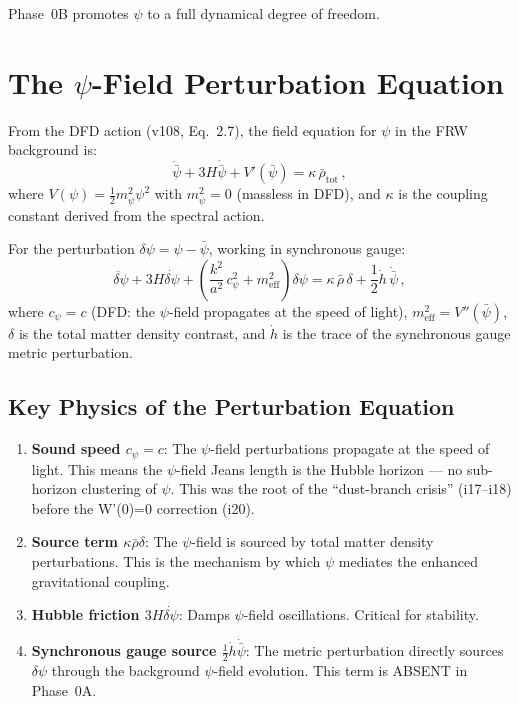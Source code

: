 \documentclass[11pt,a4paper]{article}
\begin{document}
Phase~0B promotes $\psi$ to a full dynamical degree of freedom.

\section{The $\psi$-Field Perturbation Equation}

From the DFD action (v108, Eq.~2.7), the field equation for $\psi$ in the FRW background is:
\begin{equation}
\ddot{\bar{\psi}} + 3H\dot{\bar{\psi}} + V'(\bar{\psi}) = \kappa\,\bar{\rho}_{\mathrm{tot}}\,,
\end{equation}
where $V(\psi) = \frac{1}{2}m_\psi^2\psi^2$ with $m_\psi^2 = 0$ (massless in DFD), and $\kappa$ is the coupling constant derived from the spectral action.

For the perturbation $\delta\psi = \psi - \bar{\psi}$, working in synchronous gauge:
\begin{equation}
\label{eq:psi-perturbation}
\ddot{\delta\psi} + 3H\dot{\delta\psi} + \left(\frac{k^2}{a^2}\,c_\psi^2 + m_\mathrm{eff}^2\right)\delta\psi = \kappa\,\bar{\rho}\,\delta + \frac{1}{2}\dot{h}\,\dot{\bar{\psi}}\,,
\end{equation}
where $c_\psi = c$ (DFD: the $\psi$-field propagates at the speed of light), $m_\mathrm{eff}^2 = V''(\bar{\psi})$, $\delta$ is the total matter density contrast, and $\dot{h}$ is the trace of the synchronous gauge metric perturbation.

\subsection{Key Physics of the Perturbation Equation}

\begin{enumerate}
\item \textbf{Sound speed $c_\psi = c$}: The $\psi$-field perturbations propagate at the speed of light. This means the $\psi$-field Jeans length is the Hubble horizon --- no sub-horizon clustering of $\psi$. This was the root of the ``dust-branch crisis'' (i17--i18) before the W'(0)=0 correction (i20).

\item \textbf{Source term $\kappa\bar{\rho}\delta$}: The $\psi$-field is sourced by total matter density perturbations. This is the mechanism by which $\psi$ mediates the enhanced gravitational coupling.

\item \textbf{Hubble friction $3H\dot{\delta\psi}$}: Damps $\psi$-field oscillations. Critical for stability.

\item \textbf{Synchronous gauge source $\frac{1}{2}\dot{h}\dot{\bar{\psi}}$}: The metric perturbation directly sources $\delta\psi$ through the background $\psi$-field evolution. This term is ABSENT in Phase~0A.
\end{enumerate}
\end{document}
